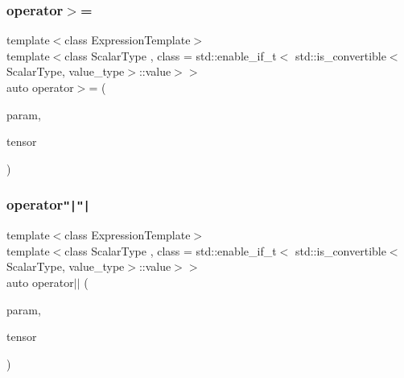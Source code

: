 \mbox{\label{classbc_1_1tensors_1_1Expression__Base_a991bb7ae9ea02aa3147e1fcf959e566e}} 
\subsubsection{\texorpdfstring{operator$>$=}{operator>=}}
{\footnotesize\ttfamily template$<$class Expression\+Template$>$ \\
template$<$class Scalar\+Type , class  = std\+::enable\+\_\+if\+\_\+t$<$   std\+::is\+\_\+convertible$<$\+Scalar\+Type, value\+\_\+type$>$\+::value$>$$>$ \\
auto operator$>$= (\begin{DoxyParamCaption}\item[{const Scalar\+Type \&}]{param,  }\item[{const \hyperlink{classbc_1_1tensors_1_1Expression__Base}{Expression\+\_\+\+Base}$<$ Expression\+Template $>$ \&}]{tensor }\end{DoxyParamCaption})\hspace{0.3cm}{\ttfamily [friend]}}

\mbox{\label{classbc_1_1tensors_1_1Expression__Base_a366931f8562cdb9f421a0296b44cb0ac}} 
\subsubsection{\texorpdfstring{operator\texttt{"|}\texttt{"|}}{operator||}}
{\footnotesize\ttfamily template$<$class Expression\+Template$>$ \\
template$<$class Scalar\+Type , class  = std\+::enable\+\_\+if\+\_\+t$<$   std\+::is\+\_\+convertible$<$\+Scalar\+Type, value\+\_\+type$>$\+::value$>$$>$ \\
auto operator$\vert$$\vert$ (\begin{DoxyParamCaption}\item[{const Scalar\+Type \&}]{param,  }\item[{const \hyperlink{classbc_1_1tensors_1_1Expression__Base}{Expression\+\_\+\+Base}$<$ Expression\+Template $>$ \&}]{tensor }\end{DoxyParamCaption})\hspace{0.3cm}{\ttfamily [friend]}}

